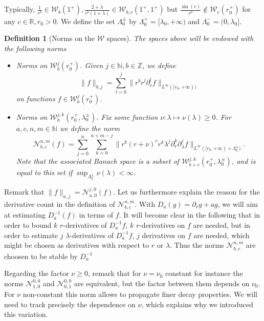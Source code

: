 \documentclass[11 pt]{amsart}
\newcommand{\nin}{\not\in}
\newtheorem{definition}{Definition}[section]
\theoremstyle{definition}
\theoremstyle{remark}
\numberwithin{equation}{section}
\begin{document}
Typically, $\frac{1}{r^b} \in \mathcal{W}_b (1^+), \frac{2+\lambda}{r^b(1+\lambda)} \in
\mathcal{W}_{b, c} (1^+, 1^+)$ but $\frac{\sin (r)}{r^b} \nin \mathcal{W}_c
(r_0^+)$ for any $c \in \mathbb{R}, r_0 > 0$.  We define the set $\Lambda_0^{\pm}$ by $\Lambda_0^+ = [\lambda_0, + \infty )$ and $\Lambda_0^- = ( 0, \lambda_0]$.

\begin{definition}[Norms on the $\mathcal{W}$ spaces]\label{phynee}
The spaces above will be endowed with the following norms
\begin{itemize}
\item[1)] Norms on $\mathcal{W}^j_b (r_0^+)$. Given $j \in \mathbb{N}, b \in
  \mathbb{Z}$, we define
  \[ \| f \|_{b, j} = \sum_{l = 0}^j \| r^b r^l \partial_r^l f
     \|_{L^{\infty} ([r_0, + \infty ))} \]
  on functions $f \in \mathcal{W}^j_b (r_0^+)$.
  
\item[2)] Norms on $\mathcal{W}^{j, k}_{b} (r_0^+, \lambda_0^{\pm})$. Fix some function
  $\nu:\lambda\mapsto \nu(\lambda) \geqslant 0$. For $a, c, n, m \in \mathbb{N}$ we define the norm
  \[ \mathcal{N}_{b, c}^{n, m} (f) = \sum_{j = 0}^n \sum_{k = 0}^{n + m
     - j} \| r^b (r + \nu)^c r^k \lambda^j \partial_r^k \partial_{\lambda}^j f
     \|_{L^{\infty} ([r_0, + \infty )\times \Lambda_0^{\pm})}. \]
  Note that the associated Banach space is a subset of $\mathcal{W}^{j, k}_{b+c} (r_0^+, \lambda_0^{\pm})$, and is equal to this set if $\sup_{\Lambda_0^\pm} \nu(\lambda)<\infty$.
\end{itemize}
\end{definition}

Remark that $\| f \|_{a, j} =\mathcal{N}_{a, 0}^{j, 0} (f)$. Let us furthermore explain
the reason for the derivative count in the definition of $\mathcal{N}_{b, c}^{n, m}$. With $D_a (g) = \partial_r g + a g$, we will aim at estimating $D_a^{- 1} (f)$ in terms of $f$. It will become clear in the following that in order to bound $k$ $r$-derivatives of $D_a^{-1} f$, $k$ $r$-derivatives on $f$ are needed, but in order to estimate $j$ $\lambda$-derivatives of $D_a^{-1} f$, $j$ derivatives on $f$ are needed, which might be chosen as derivatives with respect to $r$ or $\lambda$. Thus the norms $\mathcal{N}_{b, c}^{n, m}$ are choosen to be stable by $D_a^{- 1}$

Regarding the factor $\nu \geqslant 0$, remark that for $\nu=\nu_0$ constant for instance the norms
$\mathcal{N}_{1, 0}^{0, 0}$ and $\mathcal{N}_{0, 1}^{0, 0}$ are equivalent, but the factor between them depends on $\nu_0$. For $\nu$ non-constant this norm allows to propagate finer decay properties. We will need to track precisely
the dependence on $\nu$, which explains why we introduced this variation.
\end{document}
